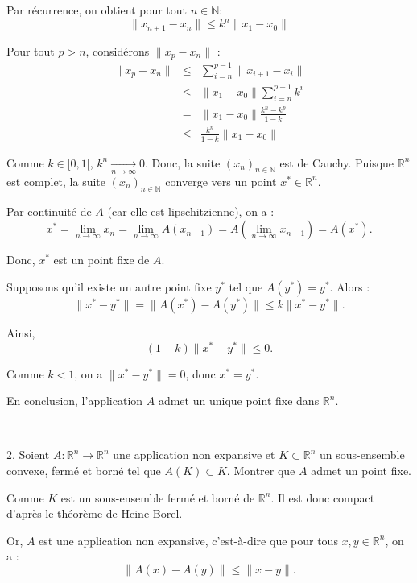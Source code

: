 Par r{\'e}currence, on obtient pour tout $n \in \mathbb{N}$:
\[ \|x_{n + 1} - x_n \| \leq k^n \|x_1 - x_0 \| \]


Pour tout $p > n$, consid{\'e}rons $\|x_p - x_n \|$ :
\begin{eqnarray*}
  \|x_p - x_n \| & \leqslant &  \sum_{i = n}^{p - 1} \|x_{i + 1} - x_i \|\\
  & \leqslant & \|x_1 - x_0 \| \sum_{i = n}^{p - 1} k^i \\
  & = & \|x_1 - x_0 \| \frac{k^n - k^p}{1 - k}\\
  & \leqslant & \frac{k^n}{1 - k} \|x_1 - x_0 \|
\end{eqnarray*}


Comme $k \in [0, 1 [$, $k^n  \underset{n \to \infty}{\to} 0$. Donc, la suite
$(x_n)_{n \in \mathbb{N}}$ est de Cauchy. Puisque $\mathbb{R}^n$ est complet,
la suite $(x_n)_{n \in \mathbb{N}}$ converge vers un point $x^{\ast} \in
\mathbb{R}^n$.

Par continuit{\'e} de $A$ (car elle est lipschitzienne), on a :
\[ x^{\ast} = \underset{n \to \infty}{\lim}  x_n = \underset{n \to
   \infty}{\lim} A (x_{n - 1}) = A \left( \underset{n \to \infty}{\lim} x_{n -
   1} \right) = A (x^{\ast}) . \]


Donc, $x^{\ast}$ est un point fixe de $A$.


Supposons qu'il existe un autre point fixe $y^{\ast}$ tel que $A (y^{\ast}) =
y^{\ast}$. Alors :
\[ \|x^{\ast} - y^{\ast} \|=\|A (x^{\ast}) - A (y^{\ast})\| \leq k\|x^{\ast} -
   y^{\ast} \|. \]


Ainsi,
\[ (1 - k)\|x^{\ast} - y^{\ast} \| \leq 0. \]


Comme $k < 1$, on a $\|x^{\ast} - y^{\ast} \|= 0$, donc $x^{\ast} = y^{\ast}$.

En conclusion, l'application $A$ admet un unique point fixe dans
$\mathbb{R}^n$.

\

2. Soient $A : \mathbb{R}^n \rightarrow \mathbb{R}^n$ une application non
expansive et $K \subset \mathbb{R}^n$ un sous-ensemble convexe, ferm{\'e} et
born{\'e} tel que $A (K) \subset K$. Montrer que $A$ admet un point fixe.

Comme $K$ est un sous-ensemble ferm{\'e} et born{\'e} de $\mathbb{R}^n$. Il
est donc compact d'apr{\`e}s le th{\'e}or{\`e}me de Heine-Borel.

Or, $A$ est une application non expansive, c'est-{\`a}-dire que pour tous $x,
y \in \mathbb{R}^n$, on a :
\[ \|A (x) - A (y)\| \leq \|x - y\|. \]


